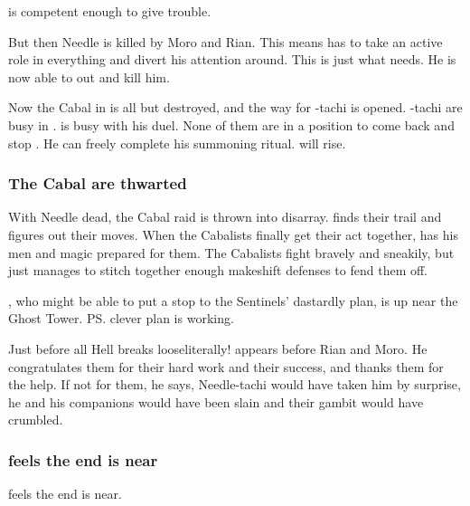 \Paerzim{} is competent enough to give \Psyrex{} trouble. 

But then Needle is killed by Moro and Rian. 
This means \Paerzim{} has to take an active role in everything and divert his attention around. 
This is just what \Psyrex{} needs. 
He is now able to out\manoeuvre \Paerzim{} and kill him. 

Now the Cabal in \Malcur is all but destroyed, and the way for \Psyrex-tachi is opened. 
\Achsah-tachi are busy in \Forclin. 
\Teshrial{} is busy with his duel. 
None of them are in a position to come back and stop \Psyrex. 
He can freely complete his summoning ritual. 
\Nithdornazsh{} will rise. 





\subsubsection{The Cabal are thwarted}
With Needle dead, the Cabal raid is thrown into disarray. 
\Psyrex{} finds their trail and figures out their moves. 
When the Cabalists finally get their act together, \Psyrex{} has his men and magic prepared for them. 
The Cabalists fight bravely and sneakily, but \Psyrex{} just manages to stitch together enough makeshift defenses to fend them off. 

\Achsah, who might be able to put a stop to the Sentinels' dastardly plan, is up near the Ghost Tower. \ps{\Secherdamon} clever plan is working. 

Just before all Hell breaks loose\dash literally!\dash\Psyrex{} appears before Rian and Moro. He congratulates them for their hard work and their success, and thanks them for the help. If not for them, he says, Needle-tachi would have taken him by surprise, he and his companions would have been slain and their gambit would have crumbled. 







\subsubsection{\Tiroco{} feels the end is near}
\Tiroco{} feels the end is near. 

